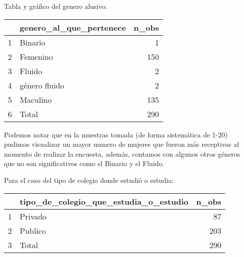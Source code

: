 \documentclass[
]{article}
\newenvironment{Shaded}{\begin{snugshade}}{\end{snugshade}}
\newcommand{\AttributeTok}[1]{\textcolor[rgb]{0.77,0.63,0.00}{#1}}
\newcommand{\CommentTok}[1]{\textcolor[rgb]{0.56,0.35,0.01}{\textit{#1}}}
\newcommand{\ConstantTok}[1]{\textcolor[rgb]{0.00,0.00,0.00}{#1}}
\newcommand{\FunctionTok}[1]{\textcolor[rgb]{0.00,0.00,0.00}{#1}}
\newcommand{\NormalTok}[1]{#1}
\newcommand{\OtherTok}[1]{\textcolor[rgb]{0.56,0.35,0.01}{#1}}
\newcommand{\StringTok}[1]{\textcolor[rgb]{0.31,0.60,0.02}{#1}}
\begin{document}
Tabla y gráfico del genero alusivo.

\begin{Shaded}
\end{Shaded}

\begin{table}[ht]
\centering
\begin{tabular}{rlr}
  \hline
 & genero\_al\_que\_pertenece & n\_obs \\ 
  \hline
1 & Binario &   1 \\ 
  2 & Femenino & 150 \\ 
  3 & Fluido &   2 \\ 
  4 & género fluido &   2 \\ 
  5 & Maculino & 135 \\ 
  6 & Total & 290 \\ 
   \hline
\end{tabular}
\end{table}

Podemos notar que en la muestras tomada (de forma sistemática de 1-20)
pudimos visualizar un mayor numero de mujeres que fueron más receptivas
al momento de realizar la encuesta, además, contamos con algunos otros
géneros que no son significativos como el Binario y el Fluido.

Para el caso del tipo de colegio donde estudió o estudia:

\begin{Shaded}
\end{Shaded}

\begin{table}[ht]
\centering
\begin{tabular}{rlr}
  \hline
 & tipo\_de\_colegio\_que\_estudia\_o\_estudio & n\_obs \\ 
  \hline
1 & Privado &  87 \\ 
  2 & Publico & 203 \\ 
  3 & Total & 290 \\ 
   \hline
\end{tabular}
\end{table}
\end{document}
